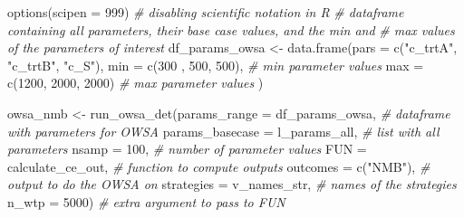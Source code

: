 \documentclass[
]{article}
\newenvironment{Shaded}{\begin{snugshade}}{\end{snugshade}}
\newcommand{\AttributeTok}[1]{\textcolor[rgb]{0.77,0.63,0.00}{#1}}
\newcommand{\CommentTok}[1]{\textcolor[rgb]{0.56,0.35,0.01}{\textit{#1}}}
\newcommand{\DecValTok}[1]{\textcolor[rgb]{0.00,0.00,0.81}{#1}}
\newcommand{\FunctionTok}[1]{\textcolor[rgb]{0.00,0.00,0.00}{#1}}
\newcommand{\NormalTok}[1]{#1}
\newcommand{\OtherTok}[1]{\textcolor[rgb]{0.56,0.35,0.01}{#1}}
\newcommand{\StringTok}[1]{\textcolor[rgb]{0.31,0.60,0.02}{#1}}
\begin{document}
\begin{Shaded}
\begin{Highlighting}[]
\FunctionTok{options}\NormalTok{(}\AttributeTok{scipen =} \DecValTok{999}\NormalTok{) }\CommentTok{\# disabling scientific notation in R}
\CommentTok{\# dataframe containing all parameters, their base case values, and the min and }
\CommentTok{\# max values of the parameters of interest }
\NormalTok{df\_params\_owsa }\OtherTok{\textless{}{-}} \FunctionTok{data.frame}\NormalTok{(}\AttributeTok{pars =} \FunctionTok{c}\NormalTok{(}\StringTok{"c\_trtA"}\NormalTok{, }\StringTok{"c\_trtB"}\NormalTok{, }\StringTok{"c\_S"}\NormalTok{),}
                             \AttributeTok{min  =} \FunctionTok{c}\NormalTok{(}\DecValTok{300}\NormalTok{ , }\DecValTok{500}\NormalTok{, }\DecValTok{500}\NormalTok{),  }\CommentTok{\# min parameter values}
                             \AttributeTok{max  =} \FunctionTok{c}\NormalTok{(}\DecValTok{1200}\NormalTok{, }\DecValTok{2000}\NormalTok{, }\DecValTok{2000}\NormalTok{)  }\CommentTok{\# max parameter values}
\NormalTok{)}

\NormalTok{owsa\_nmb  }\OtherTok{\textless{}{-}} \FunctionTok{run\_owsa\_det}\NormalTok{(}\AttributeTok{params\_range     =}\NormalTok{ df\_params\_owsa,    }\CommentTok{\# dataframe with parameters for OWSA}
                          \AttributeTok{params\_basecase  =}\NormalTok{ l\_params\_all,      }\CommentTok{\# list with all parameters}
                          \AttributeTok{nsamp            =} \DecValTok{100}\NormalTok{,               }\CommentTok{\# number of parameter values}
                          \AttributeTok{FUN              =}\NormalTok{ calculate\_ce\_out,  }\CommentTok{\# function to compute outputs}
                          \AttributeTok{outcomes         =} \FunctionTok{c}\NormalTok{(}\StringTok{"NMB"}\NormalTok{),          }\CommentTok{\# output to do the OWSA on}
                          \AttributeTok{strategies       =}\NormalTok{ v\_names\_str,       }\CommentTok{\# names of the strategies}
                          \AttributeTok{n\_wtp            =} \DecValTok{5000}\NormalTok{)              }\CommentTok{\# extra argument to pass to FUN}
\end{Highlighting}
\end{Shaded}
\end{document}
